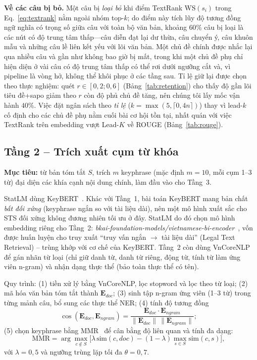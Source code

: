 \textbf{Về các câu bị bỏ.} Một câu bị \emph{loại bỏ} khi điểm TextRank
$\mathrm{WS}(s_i)$ trong Eq.~\eqref{eq:textrank} nằm ngoài nhóm top-$k$; do điểm này
tích lũy độ tương đồng ngữ nghĩa có trọng số giữa câu với toàn bộ văn bản, khoảng
$60\%$ câu bị loại là các nút có độ trung tâm thấp---câu diễn đạt lại dư thừa, câu
chuyển ý, câu khuôn mẫu và những câu lề liên kết yếu với lõi văn bản. Một chủ đề
chính được nhắc lại qua nhiều câu và gần như không bao giờ bị mất, trong khi một chủ
đề phụ chỉ hiện diện ở vài câu có độ trung tâm thấp có thể rơi dưới ngưỡng cắt và,
vì pipeline là vòng hở, không thể khôi phục ở các tầng sau. Tỉ lệ giữ lại được chọn
theo thực nghiệm: quét $r\in[0{,}2;0{,}6]$ (Bảng~\ref{tab:retention}) cho thấy độ gần
lõi tiêu đề+sapo giảm theo $r$ còn độ phủ chủ đề tăng, nên chúng tôi lấy mốc vận hành
$40\%$. Việc đặt ngân sách theo \emph{tỉ lệ} ($k=\max(5,\lceil 0{,}4n\rceil)$) thay vì
lead-$k$ cố định cho các chủ đề phụ nằm cuối bài cơ hội tồn tại, nhất quán với việc
TextRank trên embedding vượt Lead-$K$ về ROUGE (Bảng~\ref{tab:rouge}).

\subsection{Tầng 2 -- Trích xuất cụm từ khóa}
\textbf{Mục tiêu:} từ bản tóm tắt $S$, trích $m$ keyphrase (mặc định $m=10$, mỗi
cụm 1--3 từ) đại diện các khía cạnh nội dung chính, làm đầu vào cho Tầng~3.

StatLM dùng KeyBERT~\cite{grootendorst2020keybert}. Khác với Tầng~1, bài toán
KeyBERT mang bản chất \emph{bất đối xứng} (keyphrase ngắn so với tài liệu dài),
nên một mô hình xuất sắc cho STS đối xứng không đương nhiên tối ưu ở đây. StatLM
do đó chọn mô hình embedding riêng cho Tầng~2:
\emph{bkai-foundation-models/vietnamese-bi-encoder}~\cite{nguyen2025improving},
vốn được huấn luyện cho truy xuất ``truy vấn ngắn $\rightarrow$ tài liệu dài''
(Legal Text Retrieval) -- trùng khớp với cơ chế của KeyBERT. Tầng~2 còn dùng
VnCoreNLP~\cite{vu2018vncorenlp} để gán nhãn từ loại (chỉ giữ danh từ, danh từ
riêng, động từ, tính từ làm ứng viên n-gram) và nhận dạng thực thể (bảo toàn thực
thể có tên).

Quy trình: (1) tiền xử lý bằng VnCoreNLP, lọc stopword và lọc theo từ loại; (2)
mã hóa văn bản tóm tắt thành $\mathbf{E}_{doc}$; (3) sinh tập n-gram ứng viên
(1--3 từ) trong từng mảnh câu, bổ sung các thực thể NER; (4) tính độ tương đồng
\begin{equation}
\cos(\mathbf{E}_{doc},\mathbf{E}_{ngram}) =
\frac{\mathbf{E}_{doc}\cdot \mathbf{E}_{ngram}}
{\lVert \mathbf{E}_{doc}\rVert\,\lVert \mathbf{E}_{ngram}\rVert};
\label{eq:cosine}
\end{equation}
(5) chọn keyphrase bằng MMR~\cite{carbonell1998use} để cân bằng độ liên quan và
tính đa dạng:
\begin{equation}
\mathrm{MMR} = \arg\max_{c\notin S}\Big[\lambda\,\mathrm{sim}(c,doc)
-(1-\lambda)\max_{s\in S}\mathrm{sim}(c,s)\Big],
\label{eq:mmr}
\end{equation}
với $\lambda=0{,}5$ và ngưỡng trùng lặp tối đa $\theta=0{,}7$.


